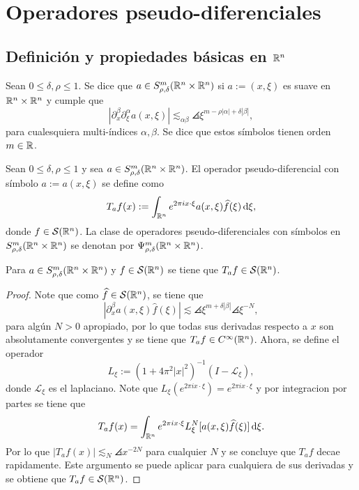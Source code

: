 \chapter{Operadores pseudo-diferenciales}

\section{Definición y propiedades básicas en $\mathbb{R}^n$}
\begin{definition}
	Sean $0\leq\delta,\rho\leq1$. Se dice que $a \in S^m_{\rho,\delta}(\mathbb{R}^n\times\mathbb{R}^n)$ si $a:=(x,\xi)$ es suave en $\mathbb{R}^n\times\mathbb{R}^n$ y cumple que
	\begin{equation*}
		|\partial^\beta_x\partial^\alpha_\xi a(x, \xi)| \lesssim_{\alpha\beta}\angles{\xi}^{m-\rho|\alpha|+\delta|\beta|},
	\end{equation*}
	para cualesquiera multi-índices $\alpha,\beta$. Se dice que estos símbolos tienen orden $m\in\mathbb{R}$.
\end{definition}
\begin{definition}
	Sean $0\leq\delta,\rho\leq1$ y sea $a \in S^m_{\rho,\delta}(\mathbb{R}^n\times\mathbb{R}^n)$. El operador pseudo-diferencial con símbolo $a:=a(x,\xi)$ se define como
	\begin{equation*}
		T_af(x):= \int_{\mathbb{R}^n} e^{2\pi ix\cdot\xi} a(x, \xi)\widehat{f}(\xi)\mathop{}\!\mathrm{d} \xi,
	\end{equation*}
	donde $f\in\mathcal{S}(\mathbb{R}^n)$. La clase de operadores pseudo-diferenciales con símbolos en $S^m_{\rho,\delta}(\mathbb{R}^n\times\mathbb{R}^n)$ se denotan por $\Psi^m_{\rho,\delta}(\mathbb{R}^n\times\mathbb{R}^n)$.
\end{definition}
\begin{proposition}
	Para $a \in S^m_{\rho,\delta}(\mathbb{R}^n\times\mathbb{R}^n)$ y $f\in\mathcal{S}(\mathbb{R}^n)$ se tiene que $T_af\in\mathcal{S}(\mathbb{R}^n)$.
\end{proposition}
\begin{proof}
	Note que como $\widehat{f}\in\mathcal{S}(\mathbb{R}^n)$, se tiene que 
	\[|\partial^\beta_xa(x, \xi)\widehat{f}(\xi)|\lesssim \angles{\xi}^{m+\delta|\beta|}\angles{\xi}^{-N} ,\]
	para algún $N>0$ apropiado, por lo que todas sus derivadas respecto a $x$ son absolutamente convergentes y se tiene que $T_af\in C^\infty(\mathbb{R}^n)$. Ahora, se define el operador 
	\begin{equation*}
		L_\xi := (1 + 4\pi^2|x|^2)^{-1}(I-\mathcal{L}_\xi),
	\end{equation*}
	donde $\mathcal{L}_\xi$ es el laplaciano. Note que $ L_\xi(e^{2\pi ix\cdot\xi}) = e^{2\pi ix\cdot \xi} $ y por integracion por partes se tiene que
	\begin{equation*}
		T_af(x) = \int_{\mathbb{R}^n} e^{2\pi ix\cdot \xi}L_\xi^N [a(x,\xi)\widehat{f}(\xi)] \mathop{}\!\mathrm{d} \xi.
	\end{equation*}
	Por lo que $|T_af(x)| \lesssim_N \angles{x}^{-2N}$ para cualquier $N$ y se concluye que $T_af$ decae rapidamente. Este argumento se puede aplicar para cualquiera de sus derivadas y se obtiene que $T_af\in\mathcal{S}(\mathbb{R}^n)$.
\end{proof}
